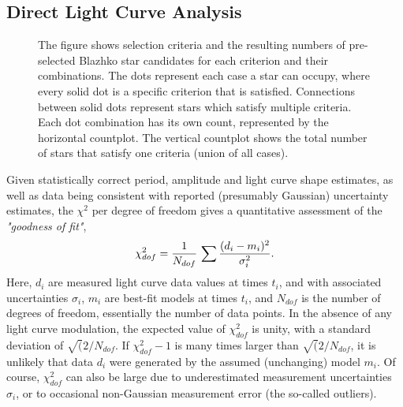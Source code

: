  
\subsection{Direct Light Curve Analysis}

\begin{figure}[ht]
    \centering
    \vskip -0.3in
    \caption{The figure shows selection criteria and the resulting numbers of pre-selected Blazhko star candidates for each
      criterion and their combinations. The dots represent each case a star can occupy, where every solid dot is a specific
      criterion that is satisfied. Connections between solid dots represent stars which satisfy multiple criteria. Each dot
      combination has its own count, represented by the horizontal countplot. The vertical countplot shows the total number
      of stars that satisfy one criteria (union of all cases).}
      \label{fig:selstats}
    \end{figure}
    
Given statistically correct period, amplitude and light curve shape estimates,
as well as data being consistent with reported (presumably Gaussian) uncertainty estimates, the $\chi^2$ per degree
of freedom gives a quantitative assessment of the \textit{"goodness of fit"},
\begin{equation}
        \chi_{dof}^2 = {1 \over N_{dof}} \, \sum{\frac{(d_i - m_i)^2}{\sigma_i^2}}.
\end{equation}
Here, $d_i$ are measured light curve data values at times $t_i$, and with associated uncertainties $\sigma_i$,
$m_i$ are best-fit models at times $t_i$, and $N_{dof}$ is the number of degrees of freedom, essentially the
number of data points. In the absence of any light curve modulation, the expected value of $\chi^2_{dof}$ is
unity, with a standard deviation of $\sqrt(2/N_{dof}$.  If $\chi^2_{dof} - 1$ is many times  larger than 
$\sqrt(2/N_{dof}$, it is unlikely that data $d_i$ were generated by the assumed (unchanging) model $m_i$.  
Of course, $\chi^2_{dof}$ can also be large due to underestimated measurement uncertainties $\sigma_i$,
or to occasional non-Gaussian measurement error (the so-called outliers). 

